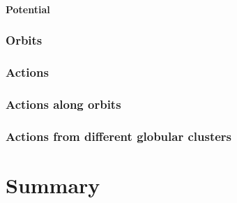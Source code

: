 \documentclass[a4paper,12pt,abstracton]{scrartcl}
\begin{document}
\subsection{Potential}
\section{Orbits}
\section{Actions}
\section{Actions along orbits}
\section{Actions from different globular clusters}
\newpage
\part{Summary}
\end{document}
